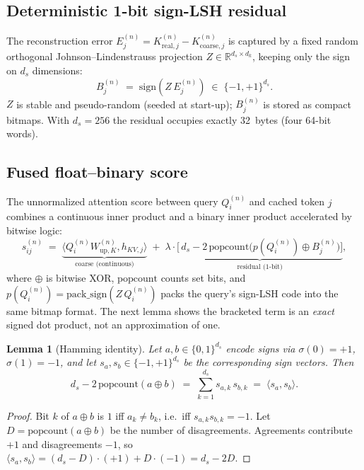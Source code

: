 \documentclass[11pt]{article}
\theoremstyle{plain}
\newtheorem{lemma}{Lemma}
\theoremstyle{definition}
\newcommand{\ds}{d_s}
\newcommand{\dk}{d_k}
\newcommand{\inner}[2]{\langle #1, #2 \rangle}
\newcommand{\popc}{\mathrm{popcount}}
\newcommand{\sign}{\mathrm{sign}}
\begin{document}
\subsection{Deterministic 1-bit sign-LSH residual}
The reconstruction error
$E_j^{(n)} = K_{\text{real},j}^{(n)} - K_{\text{coarse},j}^{(n)}$ is
captured by a fixed random orthogonal Johnson--Lindenstrauss projection
$Z \in \mathbb{R}^{\ds \times \dk}$, keeping only the sign on $\ds$
dimensions:
\begin{equation}
  B_j^{(n)} \;=\; \sign\!\left( Z\, E_j^{(n)} \right) \;\in\; \{-1,+1\}^{\ds}.
\end{equation}
$Z$ is stable and pseudo-random (seeded at start-up); $B_j^{(n)}$ is
stored as compact bitmaps. With $\ds = 256$ the residual occupies
exactly 32~bytes (four 64-bit words).

\subsection{Fused float--binary score}
The unnormalized attention score between query $Q_i^{(n)}$ and cached
token $j$ combines a continuous inner product and a binary inner product
accelerated by bitwise logic:
\begin{equation}
  s_{ij}^{(n)} \;=\;
  \underbrace{\inner{Q_i^{(n)} W_{\text{up},K}^{(n)}}{h_{KV,j}}}_{\text{coarse (continuous)}}
  \;+\;
  \lambda \cdot
  \underbrace{\Big[\,\ds - 2\,\popc\big(p(Q_i^{(n)}) \oplus B_j^{(n)}\big)\Big]}_{\text{residual (1-bit)}},
  \label{eq:score}
\end{equation}
where $\oplus$ is bitwise XOR, $\popc$ counts set bits, and
$p(Q_i^{(n)}) = \mathrm{pack\_sign}(Z\,Q_i^{(n)})$ packs the query's
sign-LSH code into the same bitmap format. The next lemma shows the
bracketed term is an \emph{exact} signed dot product, not an
approximation of one.

\begin{lemma}[Hamming identity]
\label{lem:hamming}
Let $a,b \in \{0,1\}^{\ds}$ encode signs via $\sigma(0)=+1$,
$\sigma(1)=-1$, and let $s_a, s_b \in \{-1,+1\}^{\ds}$ be the
corresponding sign vectors. Then
\begin{equation}
  \ds - 2\,\popc(a \oplus b) \;=\; \sum_{k=1}^{\ds} s_{a,k}\, s_{b,k}
  \;=\; \inner{s_a}{s_b}.
\end{equation}
\end{lemma}
\begin{proof}
Bit $k$ of $a \oplus b$ is $1$ iff $a_k \neq b_k$, i.e.\ iff
$s_{a,k} s_{b,k} = -1$. Let $D = \popc(a\oplus b)$ be the number of
disagreements. Agreements contribute $+1$ and disagreements $-1$, so
$\inner{s_a}{s_b} = (\ds - D)\cdot(+1) + D\cdot(-1) = \ds - 2D$.
\end{proof}
\end{document}

